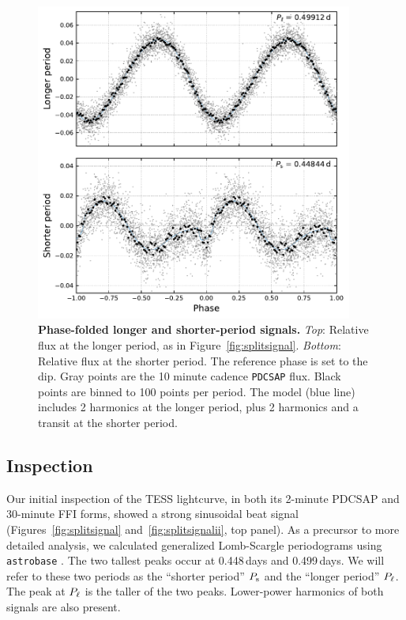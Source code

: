 \documentclass[12pt,twocolumn,tighten]{aastex62}
\begin{document}
\begin{figure}[t]
	\begin{center}
		\leavevmode
		\includegraphics[width=0.93\textwidth]{f3.pdf}
	\end{center}
	\vspace{-0.7cm}
	\caption{ {\bf Phase-folded longer and shorter-period signals.}
    {\it Top}: Relative flux at the longer period, as in
    Figure~\ref{fig:splitsignal}.  {\it Bottom}: Relative flux at the
    shorter period. The reference phase is set to the dip.  Gray
    points are the 10 minute cadence \texttt{PDCSAP} flux.  Black
    points are binned to 100 points per period.
    The model (blue line)
    includes 2 harmonics at the longer period,
    plus 2 harmonics and a transit at the shorter period.
		\label{fig:phasefold}
	}
\end{figure}

\subsection{Inspection}

Our initial inspection of the TESS lightcurve, in both its 2-minute
PDCSAP and 30-minute FFI forms, showed a strong sinusoidal beat signal
(Figures~\ref{fig:splitsignal} and~\ref{fig:splitsignalii}, top
panel). As a precursor to more detailed analysis, we calculated
generalized Lomb-Scargle periodograms using \texttt{astrobase}
\citep{lomb_1976,scargle_studies_1982,vanderplas_periodograms_2015,bhatti_astrobase_2018}.
The two tallest peaks occur at 0.448\,days and 0.499\,days.  We will
refer to these two periods as the ``shorter period'' $P_{\rm s}$ and
the ``longer period'' $P_{\rm \ell}$.  The peak at $P_{\rm \ell}$ is
the taller of the two peaks.  Lower-power harmonics of both signals
are also present.
\end{document}
